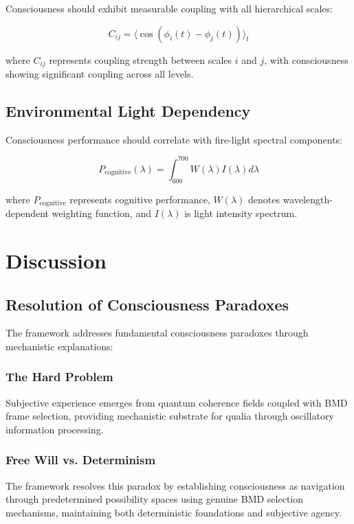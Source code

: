 \documentclass[12pt,a4paper]{article}
\begin{document}
Consciousness should exhibit measurable coupling with all hierarchical scales:

\begin{equation}
C_{ij} = \langle \cos(\phi_i(t) - \phi_j(t)) \rangle_t
\end{equation}

where $C_{ij}$ represents coupling strength between scales $i$ and $j$, with consciousness showing significant coupling across all levels.

\subsection{Environmental Light Dependency}

Consciousness performance should correlate with fire-light spectral components:

\begin{equation}
P_{\text{cognitive}}(\lambda) = \int_{600}^{700} W(\lambda) I(\lambda) d\lambda
\end{equation}

where $P_{\text{cognitive}}$ represents cognitive performance, $W(\lambda)$ denotes wavelength-dependent weighting function, and $I(\lambda)$ is light intensity spectrum.

\section{Discussion}

\subsection{Resolution of Consciousness Paradoxes}

The framework addresses fundamental consciousness paradoxes through mechanistic explanations:

\subsubsection{The Hard Problem}
Subjective experience emerges from quantum coherence fields coupled with BMD frame selection, providing mechanistic substrate for qualia through oscillatory information processing.

\subsubsection{Free Will vs. Determinism}
The framework resolves this paradox by establishing consciousness as navigation through predetermined possibility spaces using genuine BMD selection mechanisms, maintaining both deterministic foundations and subjective agency.
\end{document}

